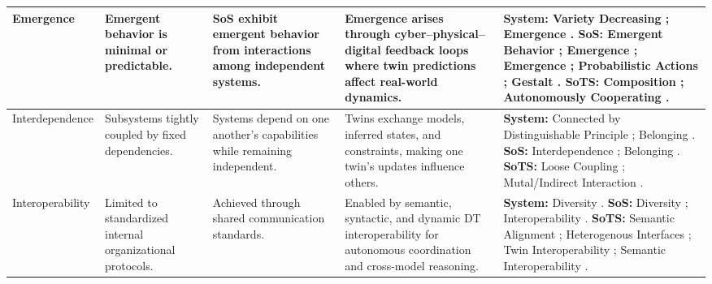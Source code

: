 \begin{table}[htbp]
\begin{adjustbox}{center}
\begin{tabularx}{1.15\textwidth}{
  >{\raggedright\arraybackslash}p{2.5cm}
  >{\raggedright\arraybackslash}p{3cm}
  >{\raggedright\arraybackslash}p{3cm}
  >{\raggedright\arraybackslash}p{3.7cm}
  >{\raggedright\arraybackslash}X }
\hline

Emergence &
Emergent behavior is minimal or predictable. &
SoS exhibit emergent behavior from interactions among independent systems. &
Emergence arises through cyber–physical–digital feedback loops where twin predictions affect real-world dynamics. &
\textbf{System:} Variety Decreasing \cite{ackoff1971towards}; Emergence \cite{boardman2006system}.\newline
\textbf{SoS:} Emergent Behavior \cite{maier1998architecting}; Emergence \cite{boardman2006system}; Emergence \cite{nielsen2015systems}; Probabilistic Actions \cite{jackson1984towards}; Gestalt \cite{boulding1956general}.\newline
\textbf{SoTS:} Composition \cite{gill2024toward}; Autonomously Cooperating \cite{dietz2020digital}. \\

\hline

Interdependence &
Subsystems tightly coupled by fixed dependencies. &
Systems depend on one another’s capabilities while remaining independent. &
Twins exchange models, inferred states, and constraints, making one twin’s updates influence others. &
\textbf{System:} Connected by Distinguishable Principle \cite{jordan1960some}; Belonging \cite{boardman2006system}.\newline
\textbf{SoS:} Interdependence \cite{nielsen2015systems}; Belonging \cite{boardman2006system}.\newline
\textbf{SoTS:} Loose Coupling \cite{borth2019digital}; Mutal/Indirect Interaction  \cite{esterle2021digital}. \\

\hline

Interoperability &
Limited to standardized internal organizational protocols. &
Achieved through shared communication standards. &
Enabled by semantic, syntactic, and dynamic DT interoperability for autonomous coordination and cross-model reasoning. &
\textbf{System:} Diversity \cite{boardman2006system}.\newline
\textbf{SoS:} Diversity \cite{boardman2006system}; Interoperability \cite{nielsen2015systems}.\newline
\textbf{SoTS:} Semantic Alignment \cite{gill2024toward}; Heterogenous Interfaces \cite{michael2022integration}; Twin Interoperability \cite{olsson2023systems}; Semantic Interoperability \cite{borth2019digital}. \\

\hline
\end{tabularx}
\end{adjustbox}
\end{table}